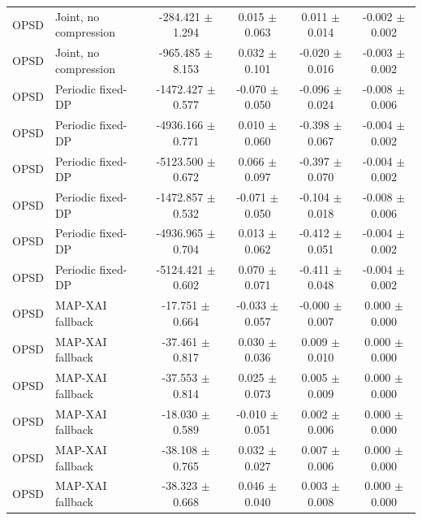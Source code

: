 \begin{tabular}{llcccc}
OPSD & Joint, no compression & -284.421 $\pm$ 1.294 & 0.015 $\pm$ 0.063 & 0.011 $\pm$ 0.014 & -0.002 $\pm$ 0.002 \\
OPSD & Joint, no compression & -965.485 $\pm$ 8.153 & 0.032 $\pm$ 0.101 & -0.020 $\pm$ 0.016 & -0.003 $\pm$ 0.002 \\
OPSD & Periodic fixed-DP & -1472.427 $\pm$ 0.577 & -0.070 $\pm$ 0.050 & -0.096 $\pm$ 0.024 & -0.008 $\pm$ 0.006 \\
OPSD & Periodic fixed-DP & -4936.166 $\pm$ 0.771 & 0.010 $\pm$ 0.060 & -0.398 $\pm$ 0.067 & -0.004 $\pm$ 0.002 \\
OPSD & Periodic fixed-DP & -5123.500 $\pm$ 0.672 & 0.066 $\pm$ 0.097 & -0.397 $\pm$ 0.070 & -0.004 $\pm$ 0.002 \\
OPSD & Periodic fixed-DP & -1472.857 $\pm$ 0.532 & -0.071 $\pm$ 0.050 & -0.104 $\pm$ 0.018 & -0.008 $\pm$ 0.006 \\
OPSD & Periodic fixed-DP & -4936.965 $\pm$ 0.704 & 0.013 $\pm$ 0.062 & -0.412 $\pm$ 0.051 & -0.004 $\pm$ 0.002 \\
OPSD & Periodic fixed-DP & -5124.421 $\pm$ 0.602 & 0.070 $\pm$ 0.071 & -0.411 $\pm$ 0.048 & -0.004 $\pm$ 0.002 \\
OPSD & MAP-XAI fallback & -17.751 $\pm$ 0.664 & -0.033 $\pm$ 0.057 & -0.000 $\pm$ 0.007 & 0.000 $\pm$ 0.000 \\
OPSD & MAP-XAI fallback & -37.461 $\pm$ 0.817 & 0.030 $\pm$ 0.036 & 0.009 $\pm$ 0.010 & 0.000 $\pm$ 0.000 \\
OPSD & MAP-XAI fallback & -37.553 $\pm$ 0.814 & 0.025 $\pm$ 0.073 & 0.005 $\pm$ 0.009 & 0.000 $\pm$ 0.000 \\
OPSD & MAP-XAI fallback & -18.030 $\pm$ 0.589 & -0.010 $\pm$ 0.051 & 0.002 $\pm$ 0.006 & 0.000 $\pm$ 0.000 \\
OPSD & MAP-XAI fallback & -38.108 $\pm$ 0.765 & 0.032 $\pm$ 0.027 & 0.007 $\pm$ 0.006 & 0.000 $\pm$ 0.000 \\
OPSD & MAP-XAI fallback & -38.323 $\pm$ 0.668 & 0.046 $\pm$ 0.040 & 0.003 $\pm$ 0.008 & 0.000 $\pm$ 0.000 \\
\bottomrule
\end{tabular}
